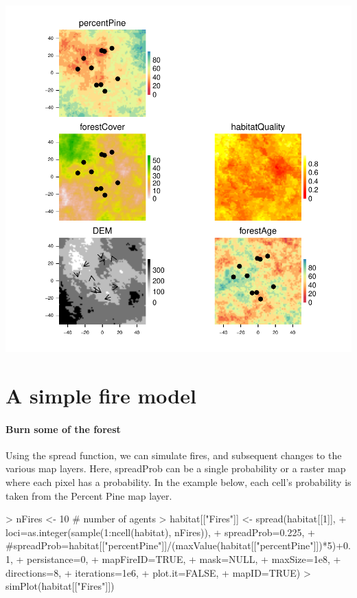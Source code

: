 \documentclass{article}
\begin{document}
\includegraphics{introduction-mobile-point-agent}

\section{A simple fire model}
\paragraph{Burn some of the forest}
Using the spread function, we can simulate fires, and subsequent changes to the various map layers. Here, spreadProb can be a single probability or a raster map where each pixel has a probability. In the example below, each cell's probability is taken from the Percent Pine map layer.

\begin{Schunk}
\begin{Sinput}
> nFires <- 10 # number of agents
> habitat[["Fires"]] <- spread(habitat[[1]],
+                              loci=as.integer(sample(1:ncell(habitat), nFires)),
+                              spreadProb=0.225,
+                              #spreadProb=habitat[["percentPine"]]/(maxValue(habitat[["percentPine"]])*5)+0.1,
+                              persistance=0,
+                              mapFireID=TRUE,
+                              mask=NULL,
+                              maxSize=1e8,
+                              directions=8,
+                              iterations=1e6,
+                              plot.it=FALSE,
+                              mapID=TRUE)
> simPlot(habitat[["Fires"]])
\end{Sinput}
\end{Schunk}
\end{document}
